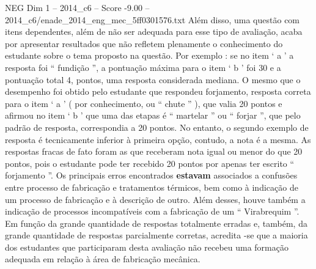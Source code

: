 \begin{textsample}{NEG Dim 1 – 2014\_c6 – Score -9.00 – 2014\_c6/enade\_2014\_eng\_mec\_5ff0301576.txt}
Além disso, uma questão com itens dependentes, além de não ser adequada para esse tipo de avaliação, acaba por apresentar resultados que não refletem plenamente o conhecimento do estudante sobre o tema proposto na questão.
Por exemplo : se no item ‘ a ’ a resposta foi “ fundição ”, a pontuação máxima para o item ‘ b ’ foi 30 e a pontuação total 4, pontos, uma resposta considerada mediana.
O mesmo que o desempenho foi obtido pelo estudante que respondeu forjamento, resposta correta para o item ‘ a ’ ( por conhecimento, ou “ chute ” ), que valia 20 pontos e afirmou no item ‘ b ’ que uma das etapas é “ martelar ” ou “ forjar ”, que pelo padrão de resposta, correspondia a 20 pontos.
No entanto, o segundo exemplo de resposta é tecnicamente inferior à primeira opção, contudo, a nota é a mesma.
As respostas fracas de fato foram as que receberam nota igual ou menor do que 20 pontos, pois o estudante pode ter recebido 20 pontos por apenas ter escrito “ forjamento ”.
Os principais erros encontrados \textbf{estavam} associados a confusões entre processo de fabricação e tratamentos térmicos, bem como à indicação de um processo de fabricação e à descrição de outro.
Além desses, houve também a indicação de processos incompatíveis com a fabricação de um “ Virabrequim ”.
Em função da grande quantidade de respostas totalmente erradas e, também, da grande quantidade de respostas parcialmente corretas, acredita -se que a maioria dos estudantes que participaram desta avaliação não recebeu uma formação adequada em relação à área de fabricação mecânica.

\end{textsample}
